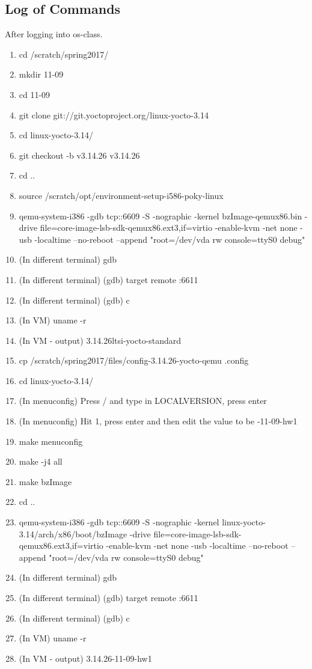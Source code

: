 \documentclass[journal, letterpaper, draftclsnofoot, onecolumn, 10pt]{IEEEtran}
\begin{document}
\subsection{Log of Commands}
After logging into os-class.
\begin{enumerate}
\item cd /scratch/spring2017/
\item mkdir 11-09
\item cd 11-09
\item git clone git://git.yoctoproject.org/linux-yocto-3.14
\item cd linux-yocto-3.14/
\item git checkout -b v3.14.26 v3.14.26
\item cd ..
\item source /scratch/opt/environment-setup-i586-poky-linux
\item qemu-system-i386 -gdb tcp::6609 -S -nographic -kernel bzImage-qemux86.bin -drive file=core-image-lsb-sdk-qemux86.ext3,if=virtio -enable-kvm -net none -usb -localtime --no-reboot --append "root=/dev/vda rw console=ttyS0 debug"
\item (In different terminal) gdb
\item (In different terminal) (gdb) target remote :6611
\item (In different terminal) (gdb) c
\item (In VM) uname -r
\item (In VM - output) 3.14.26ltsi-yocto-standard
\item cp /scratch/spring2017/files/config-3.14.26-yocto-qemu .config
\item cd linux-yocto-3.14/
\item (In menuconfig) Press / and type in LOCALVERSION, press enter
\item (In menuconfig) Hit 1, press enter and then edit the value to be -11-09-hw1
\item make menuconfig
\item make -j4 all
\item make bzImage
\item cd ..
\item qemu-system-i386 -gdb tcp::6609 -S -nographic -kernel linux-yocto-3.14/arch/x86/boot/bzImage -drive file=core-image-lsb-sdk-qemux86.ext3,if=virtio -enable-kvm -net none -usb -localtime --no-reboot --append "root=/dev/vda rw console=ttyS0 debug"
\item (In different terminal) gdb
\item (In different terminal) (gdb) target remote :6611
\item (In different terminal) (gdb) c
\item (In VM) uname -r
\item (In VM - output) 3.14.26-11-09-hw1
\end{enumerate}
\end{document}
